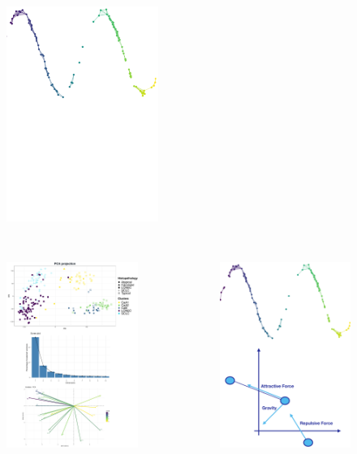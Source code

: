 \documentclass[compress]{beamer}
\begin{document}
\begin{frame}
\begin{overprint}
\begin{columns}[c]
  \begin{column}{0.5\linewidth}
   \begin{figure}
\centering
\includegraphics[height=7cm]{figures/methods/how_umap_works_basic_graph.pdf}
  \end{figure}
  \end{column}
 \end{columns}
 
 
\begin{columns}[t]
  \begin{column}{0.5\linewidth}
  \begin{figure}
\centering
\includegraphics[height=7cm]{figures/methods/pca-methods2.pdf}
  \end{figure}
  \end{column}

  \begin{column}{0.5\linewidth}

     \begin{figure}
\centering
\includegraphics[height=7cm]{figures/methods/umap_forces.pdf}
  \end{figure}
    

\end{column}
\end{columns}
\end{overprint}
\end{frame}
\end{document}
